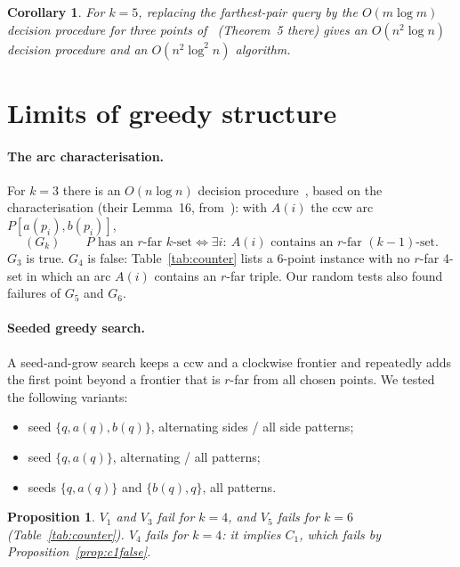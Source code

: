 \documentclass[11pt,a4paper]{article}
\newtheorem{corollary}[theorem]{Corollary}
\newtheorem{proposition}[theorem]{Proposition}
\theoremstyle{definition}
\begin{document}
\begin{corollary}\label{cor:k5}
For $k=5$, replacing the farthest-pair query by the $O(m\log m)$ decision
procedure for three points of~\cite{TW25} (Theorem~5 there) gives an
$O(n^2\log n)$ decision procedure and an $O(n^2\log^2n)$ algorithm.
\end{corollary}

\section{Limits of greedy structure}\label{sec:greedy}

\paragraph{The arc characterisation.} For $k=3$ there is an $O(n\log n)$
decision procedure~\cite{TW25}, based on the characterisation (their Lemma~16,
from~\cite{Kob21}): with $A(i)$ the ccw arc $P[a(p_i),b(p_i)]$,
\[
(G_k)\qquad P\text{ has an $r$-far $k$-set}\iff\exists i:\ A(i)\text{ contains an $r$-far $(k-1)$-set}.
\]
$G_3$ is true. $G_4$ is false: Table~\ref{tab:counter} lists a 6-point
instance with no $r$-far 4-set in which an arc $A(i)$ contains an $r$-far
triple. Our random tests also found failures of $G_5$ and $G_6$.

\paragraph{Seeded greedy search.} A seed-and-grow search keeps a ccw and a
clockwise frontier and repeatedly adds the first point beyond a frontier that
is $r$-far from all chosen points. We tested the following variants:
\begin{itemize}[leftmargin=*]
\item[$V_1$/$V_3$:] seed $\{q,a(q),b(q)\}$, alternating sides / all side patterns;
\item[$V_5$/$V_4$:] seed $\{q,a(q)\}$, alternating / all patterns;
\item[$V_4^{\pm}$:] seeds $\{q,a(q)\}$ and $\{b(q),q\}$, all patterns.
\end{itemize}

\begin{proposition}\label{prop:greedy}
$V_1$ and $V_3$ fail for $k=4$, and $V_5$ fails for $k=6$
(Table~\ref{tab:counter}). $V_4$ fails for $k=4$: it implies $C_1$, which
fails by Proposition~\ref{prop:c1false}.
\end{proposition}
\end{document}
